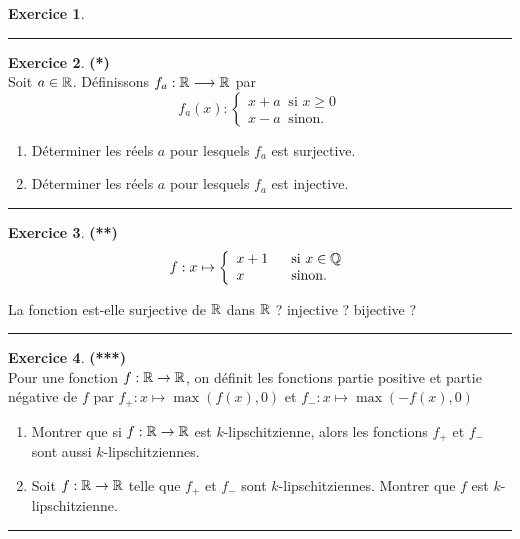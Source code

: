 \documentclass[a4paper,11pt]{article}
\theoremstyle{definition}
\newtheorem{exo}{Exercice} %
\begin{document}
\begin{minipage}{1\linewidth}
\begin{minipage}[t]{0.48\linewidth}
\begin{exo}
	
	
	\centering
	\rule{1\linewidth}{0.6pt}
\end{exo}



\end{minipage}	
\hfill\vrule\hfill
\begin{minipage}[t]{0.48\linewidth}
\raggedright




\begin{exo}\textbf{(*)}\quad\\[0.2cm]
	
Soit $a \in \R$. Définissons $f_a : \R \longrightarrow \R$ par
$$f_a(x):\left\{\begin{array}{l}
	x + a  \ \text{ si } x\geq 0\\
	
	x - a \ \text{ sinon. }
\end{array}\right.$$
	\begin{enumerate}
		\item Déterminer les réels $a$  pour lesquels  $f_a$ est surjective.
		\item Déterminer les réels $a$  pour lesquels  $f_a$ est injective.
	\end{enumerate}
	\centering
	\rule{1\linewidth}{0.6pt}
\end{exo}


\begin{exo}\textbf{(**)}\quad\\[0.2cm]
	$$f: x \mapsto \left\{\begin{array}{ll}
	x + 1  \ & \text{ si } x\in \Q\\
	
	x \ &\text{ sinon. }
\end{array}\right.$$

	La fonction est-elle surjective de $\mathbb{R}$ dans $\mathbb{R}$ ? injective ? bijective ?
	
	\centering
	\rule{1\linewidth}{0.6pt}
\end{exo}

\begin{exo}\textbf{(***)}\quad\\[0.2cm]
Pour une fonction $f : \mathbb{R} \rightarrow \mathbb{R}$, on définit les fonctions partie positive et partie négative de $f$ par $f_+ : x \mapsto \max(f(x),0)$ et $f_- : x \mapsto \max(-f(x),0)$
\begin{enumerate}
	\item Montrer que si $f : \mathbb{R} \rightarrow \mathbb{R}$ est $k$-lipschitzienne, alors les fonctions $f_+$ et
	$f_- $ sont aussi $k$-lipschitziennes.
	\item Soit $f : \mathbb{R} \rightarrow \mathbb{R}$ telle que $f_+$ et $f_-$ sont $k$-lipschitziennes. Montrer que $f$	est $k$-lipschitzienne.
\end{enumerate} 

	\centering
\rule{1\linewidth}{0.6pt}
\end{exo}

\end{minipage}
\end{minipage}
\newpage
\end{document}
